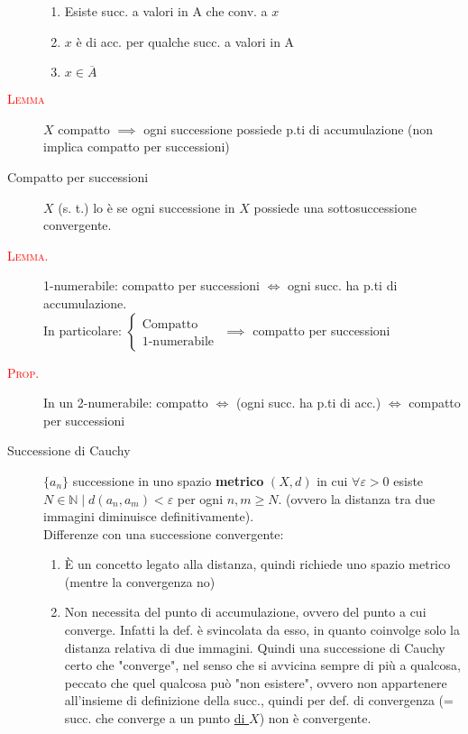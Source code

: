 \documentclass[a4paper,10pt]{article}
\newcommand{\myth}{\normalfont \scshape \textcolor{red}}
\theoremstyle{remark}
\theoremstyle{definition}
\begin{document}
\begin{description}
    \begin{enumerate}
        \item Esiste succ. a valori in A che conv. a $x$
        \item $x$ è di acc. per qualche succ. a  valori in A
        \item $ x \in \overline{A}$
    \end{enumerate}
    
    \item[\myth{Lemma}] $X$ compatto $\implies$ ogni successione possiede p.ti di  accumulazione (non implica compatto per successioni)
    \item[Compatto per successioni] $X$ (s. t.) lo è se ogni successione in $X$ possiede una sottosuccessione convergente.
    \item[\myth{Lemma.}] 1-numerabile: compatto per successioni $\iff$ ogni succ. ha p.ti di accumulazione. \\
    In particolare: 
    $\begin{cases}
        \mbox{Compatto} \\
        \mbox{1-numerabile}
    \end{cases}$
    $\implies$ compatto per successioni
    \item[\myth{Prop.}] In un 2-numerabile: compatto $\iff$ (ogni succ. ha p.ti di acc.) $\iff$ compatto per successioni
    \item[Successione di Cauchy] $\{ a_n \}$ successione in uno spazio \textbf{metrico} $(X,d)$ in cui $\forall \varepsilon > 0$ esiste $N \in \mathbb{N} \mid d(a_n, a_m) < \varepsilon $ per ogni $ n,m \ge N$. (ovvero la distanza tra due immagini diminuisce definitivamente). \\
    Differenze con una successione convergente:
    \begin{enumerate}
        \item È un concetto legato alla distanza, quindi richiede uno spazio metrico (mentre la convergenza no)
        \item Non necessita del punto di accumulazione, ovvero del punto a cui converge. Infatti la def. è svincolata da esso, in quanto coinvolge solo la distanza relativa di due immagini. Quindi una successione di Cauchy certo che "converge", nel senso che si avvicina sempre di più a qualcosa, peccato che quel qualcosa può "non esistere", ovvero non appartenere all'insieme di definizione della succ., quindi per def. di convergenza (= succ. che converge a un punto \underline{di $X$}) non è convergente.
    \end{enumerate}


\end{description}
\end{document}
